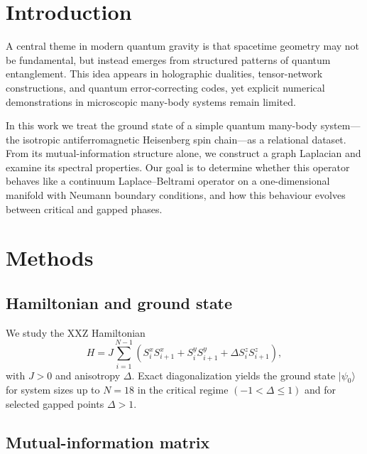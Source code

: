 \documentclass[aps,prd,twocolumn,superscriptaddress,nofootinbib]{revtex4-2}
\begin{document}
\section{Introduction}

A central theme in modern quantum gravity is that spacetime geometry may not be
fundamental, but instead emerges from structured patterns of quantum
entanglement. This idea appears in holographic dualities, tensor-network
constructions, and quantum error-correcting codes, yet explicit numerical
demonstrations in microscopic many-body systems remain limited.

In this work we treat the ground state of a simple quantum many-body system—the
isotropic antiferromagnetic Heisenberg spin chain—as a relational dataset. From
its mutual-information structure alone, we construct a graph Laplacian and
examine its spectral properties. Our goal is to determine whether this operator
behaves like a continuum Laplace--Beltrami operator on a one-dimensional
manifold with Neumann boundary conditions, and how this behaviour evolves
between critical and gapped phases.

\section{Methods}

\subsection{Hamiltonian and ground state}

We study the XXZ Hamiltonian
\begin{equation}
H = J \sum_{i=1}^{N-1}
\left(
S_i^x S_{i+1}^x +
S_i^y S_{i+1}^y +
\Delta S_i^z S_{i+1}^z
\right),
\end{equation}
with $J>0$ and anisotropy $\Delta$. Exact diagonalization yields the ground
state $\lvert \psi_0\rangle$ for system sizes up to $N=18$ in the critical
regime $(-1<\Delta\leq 1)$ and for selected gapped points $\Delta>1$.

\subsection{Mutual-information matrix}
\end{document}
